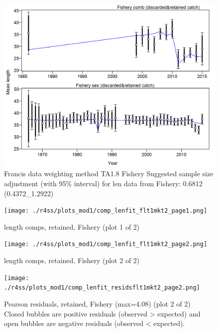 \documentclass[12pt,]{article}
\begin{document}
\begin{figure}
\centering
\includegraphics{./r4ss/plots_mod1/comp_lenfit_data_weighting_TA1.8_Fishery.png}
\caption{Francis data weighting method TA1.8 Fishery Suggested sample
size adjustment (with 95\% interval) for len data from Fishery: 0.6812
(0.4372\_1.2922)
\label{fig:mod1_4_comp_lenfit_data_weighting_TA1.8_Fishery}}
\end{figure}

\begin{figure}
\centering
\texttt{[image: ./r4ss/plots\_mod1/comp\_lenfit\_flt1mkt2\_page1.png]}
\caption{length comps, retained, Fishery (plot 1 of 2)
\label{fig:mod1_5_comp_lenfit_flt1mkt2_page1}}
\end{figure}

\begin{figure}
\centering
\texttt{[image: ./r4ss/plots\_mod1/comp\_lenfit\_flt1mkt2\_page2.png]}
\caption{length comps, retained, Fishery (plot 2 of 2)
\label{fig:mod1_6_comp_lenfit_flt1mkt2_page2}}
\end{figure}

\begin{figure}
\centering
\texttt{[image: ./r4ss/plots\_mod1/comp\_lenfit\_residsflt1mkt2\_page2.png]}
\caption{Pearson residuals, retained, Fishery (max=4.08) (plot 2 of 2)\\
Closed bubbles are positive residuals (observed \textgreater{} expected)
and open bubbles are negative residuals (observed \textless{} expected).
\label{fig:mod1_7_comp_lenfit_residsflt1mkt2_page2}}
\end{figure}
\end{document}
